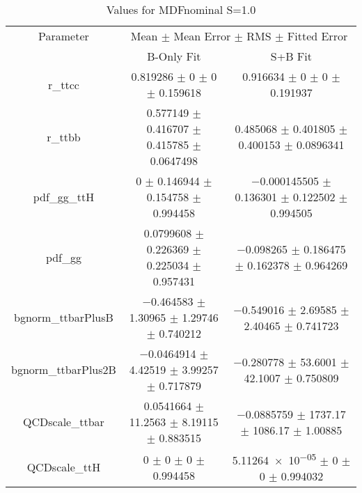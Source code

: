 \begin{table}
\centering
\caption{Values for MDFnominal S=1.0}
\begin{tabular}{ccc}
\toprule
Parameter & \multicolumn{2}{c}{Mean $\pm$ Mean Error $\pm$ RMS $\pm$ Fitted Error}\\
 & B-Only Fit & S+B Fit\\
\midrule
r\_ttcc & \num{0.819286} $\pm$ \num{0} $\pm$ \num{0} $\pm$ \num{0.159618} & \num{0.916634} $\pm$ \num{0} $\pm$ \num{0} $\pm$ \num{0.191937}\\
r\_ttbb & \num{0.577149} $\pm$ \num{0.416707} $\pm$ \num{0.415785} $\pm$ \num{0.0647498} & \num{0.485068} $\pm$ \num{0.401805} $\pm$ \num{0.400153} $\pm$ \num{0.0896341}\\
pdf\_gg\_ttH & \num{0} $\pm$ \num{0.146944} $\pm$ \num{0.154758} $\pm$ \num{0.994458} & \num{-0.000145505} $\pm$ \num{0.136301} $\pm$ \num{0.122502} $\pm$ \num{0.994505}\\
pdf\_gg & \num{0.0799608} $\pm$ \num{0.226369} $\pm$ \num{0.225034} $\pm$ \num{0.957431} & \num{-0.098265} $\pm$ \num{0.186475} $\pm$ \num{0.162378} $\pm$ \num{0.964269}\\
bgnorm\_ttbarPlusB & \num{-0.464583} $\pm$ \num{1.30965} $\pm$ \num{1.29746} $\pm$ \num{0.740212} & \num{-0.549016} $\pm$ \num{2.69585} $\pm$ \num{2.40465} $\pm$ \num{0.741723}\\
bgnorm\_ttbarPlus2B & \num{-0.0464914} $\pm$ \num{4.42519} $\pm$ \num{3.99257} $\pm$ \num{0.717879} & \num{-0.280778} $\pm$ \num{53.6001} $\pm$ \num{42.1007} $\pm$ \num{0.750809}\\
QCDscale\_ttbar & \num{0.0541664} $\pm$ \num{11.2563} $\pm$ \num{8.19115} $\pm$ \num{0.883515} & \num{-0.0885759} $\pm$ \num{1737.17} $\pm$ \num{1086.17} $\pm$ \num{1.00885}\\
QCDscale\_ttH & \num{0} $\pm$ \num{0} $\pm$ \num{0} $\pm$ \num{0.994458} & \num{5.11264e-05} $\pm$ \num{0} $\pm$ \num{0} $\pm$ \num{0.994032}\\
\bottomrule
\end{tabular}
\end{table}